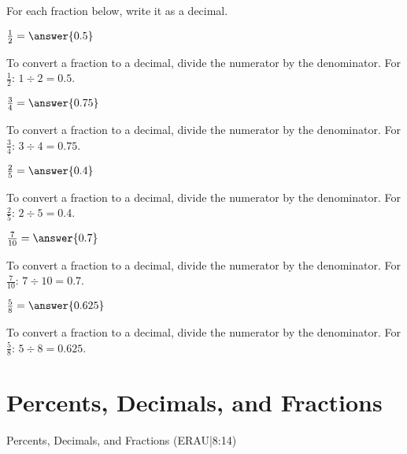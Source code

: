 \documentclass{ximera}
\begin{document}

For each fraction below, write it as a decimal.

\begin{problem}
$\frac{1}{2} = \answer{0.5}$
\begin{feedback}
To convert a fraction to a decimal, divide the numerator by the denominator. For $\frac{1}{2}$: $1 \div 2 = 0.5$.
\end{feedback}
\end{problem}

\begin{problem}
$\frac{3}{4} = \answer{0.75}$
\begin{feedback}
To convert a fraction to a decimal, divide the numerator by the denominator. For $\frac{3}{4}$: $3 \div 4 = 0.75$.
\end{feedback}
\end{problem}

\begin{problem}
$\frac{2}{5} = \answer{0.4}$
\begin{feedback}
To convert a fraction to a decimal, divide the numerator by the denominator. For $\frac{2}{5}$: $2 \div 5 = 0.4$.
\end{feedback}
\end{problem}

\begin{problem}
$\frac{7}{10} = \answer{0.7}$
\begin{feedback}
To convert a fraction to a decimal, divide the numerator by the denominator. For $\frac{7}{10}$: $7 \div 10 = 0.7$.
\end{feedback}
\end{problem}

\begin{problem}
$\frac{5}{8} = \answer{0.625}$
\begin{feedback}
To convert a fraction to a decimal, divide the numerator by the denominator. For $\frac{5}{8}$: $5 \div 8 = 0.625$.
\end{feedback}
\end{problem}


\section*{Percents, Decimals, and Fractions}

Percents, Decimals, and Fractions (ERAU|8:14)
\end{document}
